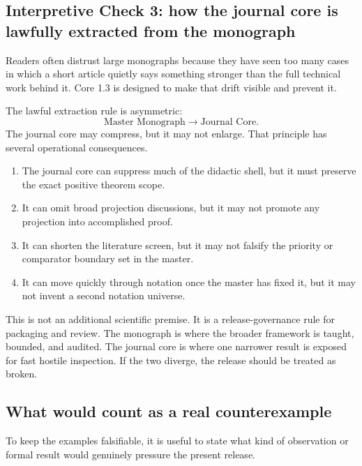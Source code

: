 \subsection{Interpretive Check 3: how the journal core is lawfully extracted from the monograph}

Readers often distrust large monographs because they have seen too many cases in which a short
article quietly says something stronger than the full technical work behind it. Core 1.3 is
designed to make that drift visible and prevent it.

The lawful extraction rule is asymmetric:
\[
\text{Master Monograph} \longrightarrow \text{Journal Core}.
\]
The journal core may compress, but it may not enlarge. That principle has several operational
consequences.

\begin{enumerate}
\item The journal core can suppress much of the didactic shell, but it must preserve the exact
      positive theorem scope.
\item It can omit broad projection discussions, but it may not promote any projection into
      accomplished proof.
\item It can shorten the literature screen, but it may not falsify the priority or comparator
      boundary set in the master.
\item It can move quickly through notation once the master has fixed it, but it may not invent a
      second notation universe.
\end{enumerate}

This is not an additional scientific premise. It is a release-governance rule for packaging and review. The
monograph is where the broader framework is taught, bounded, and audited. The journal core is
where one narrower result is exposed for fast hostile inspection. If the two diverge, the release
should be treated as broken.

\subsection{What would count as a real counterexample}

To keep the examples falsifiable, it is useful to state what kind of observation or formal result
would genuinely pressure the present release.

